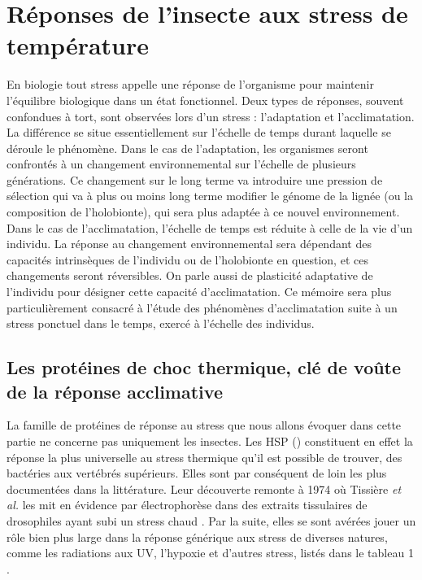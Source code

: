 \chapter{Réponses de l'insecte aux stress de température}

En biologie tout stress appelle une réponse de l'organisme pour maintenir l'équilibre biologique dans un état fonctionnel.
Deux types de réponses, souvent confondues à tort, sont observées lors d'un stress : l'adaptation et l'acclimatation.
La différence se situe essentiellement sur l'échelle de temps durant laquelle se déroule le phénomène.
Dans le cas de l'adaptation, les organismes seront confrontés à un changement environnemental sur l'échelle de plusieurs générations.
Ce changement sur le long terme va introduire une pression de sélection qui va à plus ou moins long terme modifier le génome de la lignée (ou la composition de l'holobionte), qui sera plus adaptée à ce nouvel environnement.
Dans le cas de l'acclimatation, l'échelle de temps est réduite à celle de la vie d'un individu. La réponse au changement environnemental sera dépendant des capacités intrinsèques de l'individu ou de l'holobionte en question, et ces changements seront réversibles.
On parle aussi de plasticité adaptative de l'individu pour désigner cette capacité d'acclimatation.
Ce mémoire sera plus particulièrement consacré à l'étude des
phénomènes d'acclimatation suite à un stress ponctuel dans le temps, exercé à l'échelle des individus.

	\section{Les protéines de choc thermique, clé de voûte de la réponse acclimative}

	La famille de protéines de réponse au stress que nous allons évoquer dans cette partie ne concerne pas uniquement les insectes.
	Les HSP () constituent en effet la réponse la plus universelle au stress thermique qu'il est possible de trouver, des bactéries aux vertébrés supérieurs.
	Elles sont par conséquent de loin les plus documentées dans la littérature.
	Leur découverte remonte à 1974 où Tissière \textit{et al.} les mit en évidence par électrophorèse dans des extraits tissulaires de drosophiles ayant subi un stress chaud \cite{tissieres1974}.
	Par la suite, elles se sont avérées jouer un rôle bien plus large dans la réponse générique aux stress de diverses natures, comme les radiations aux UV, l'hypoxie et d'autres stress, listés dans le tableau 1 \cite{sorensen2003}.

